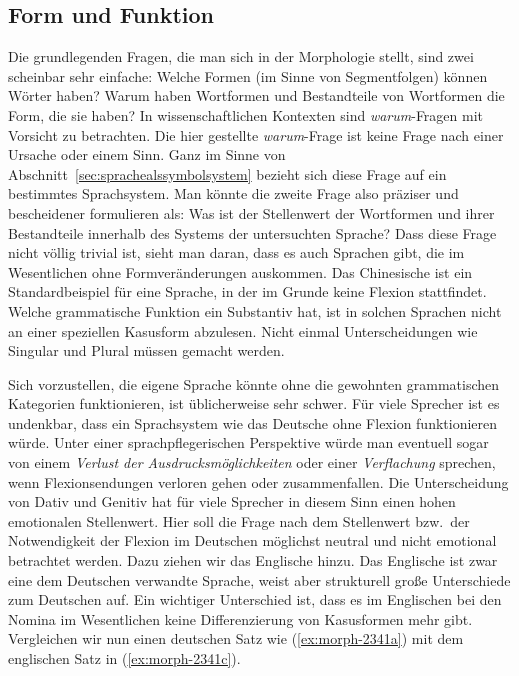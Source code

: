 \label{sec:morphkond}

\subsection{Form und Funktion}

\label{sec:morphgrundl}

Die grundlegenden Fragen, die man sich in der Morphologie stellt, sind zwei scheinbar sehr einfache:
Welche Formen (im Sinne von Segmentfolgen) können Wörter haben?
Warum haben Wortformen und Bestandteile von Wortformen die Form, die sie haben?
In wissenschaftlichen Kontexten sind \textit{warum}-Fragen mit Vorsicht zu betrachten.
Die hier gestellte \textit{warum}-Frage ist keine Frage nach einer Ursache oder einem Sinn.
Ganz im Sinne von Abschnitt~\ref{sec:sprachealssymbolsystem} bezieht sich diese Frage auf ein bestimmtes Sprachsystem.
Man könnte die zweite Frage also präziser und bescheidener formulieren als:
Was ist der Stellenwert der Wortformen und ihrer Bestandteile innerhalb des Systems der untersuchten Sprache?
Dass diese Frage nicht völlig trivial ist, sieht man daran, dass es auch Sprachen gibt, die im Wesentlichen ohne Formveränderungen auskommen.
Das Chinesische ist ein Standardbeispiel für eine Sprache, in der im Grunde keine Flexion stattfindet.
Welche grammatische Funktion \zB ein Substantiv hat, ist in solchen Sprachen nicht an einer speziellen Kasusform abzulesen.
Nicht einmal Unterscheidungen wie Singular und Plural müssen gemacht werden.

Sich vorzustellen, die eigene Sprache könnte ohne die gewohnten grammatischen Kategorien funktionieren, ist üblicherweise sehr schwer.
Für viele Sprecher ist es \zB undenkbar, dass ein Sprachsystem wie das Deutsche ohne Flexion funktionieren würde.
Unter einer sprachpflegerischen Perspektive würde man eventuell sogar von einem \textit{Verlust der Ausdrucksmöglichkeiten} oder einer \textit{Verflachung} sprechen, wenn Flexionsendungen verloren gehen oder zusammenfallen.
Die Unterscheidung von Dativ und Genitiv hat für viele Sprecher in diesem Sinn einen hohen emotionalen Stellenwert. 
Hier soll die Frage nach dem Stellenwert bzw.\ der Notwendigkeit der Flexion im Deutschen möglichst neutral und nicht emotional betrachtet werden.
Dazu ziehen wir das Englische hinzu.
Das Englische ist zwar eine dem Deutschen verwandte Sprache, weist aber strukturell große Unterschiede zum Deutschen auf.
Ein wichtiger Unterschied ist, dass es im Englischen bei den Nomina im Wesentlichen keine Differenzierung von Kasusformen mehr gibt.
Vergleichen wir nun einen deutschen Satz wie (\ref{ex:morph-2341a}) mit dem englischen Satz in (\ref{ex:morph-2341c}).

